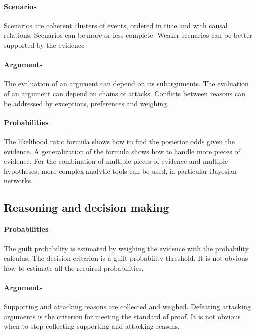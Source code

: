 \documentclass[10pt]{article}
\begin{document}
\paragraph{Scenarios}

Scenarios are coherent clusters 
of events, ordered in time and with causal relations.
Scenarios can be more or less complete.
Weaker scenarios can be better supported by the evidence.
	
\paragraph{Arguments}
The evaluation of an argument can depend on its subarguments.
The evaluation of an argument can depend on chains of attacks.
Conflicts between reasons can be addressed by exceptions, preferences and weighing.
	
\paragraph{Probabilities}

The likelihood ratio formula shows how to find the posterior odds given the evidence.
A generalization of the formula shows how to handle more pieces of evidence.
For the combination of multiple pieces of evidence and multiple hypotheses, more complex analytic tools can be used, in particular Bayesian networks.

\subsection*{Reasoning and decision making}

\paragraph{Probabilities}

The guilt probability is estimated by weighing the evidence with the probability calculus.
The decision criterion is a guilt probability threshold.
It is not obvious how to estimate all the required probabilities.
	
\paragraph{Arguments}

Supporting and attacking reasons are collected and weighed.
Defeating attacking arguments is the criterion for meeting the standard of proof.
It is not obvious when to stop collecting supporting and attacking reasons.	
	
\end{document}
